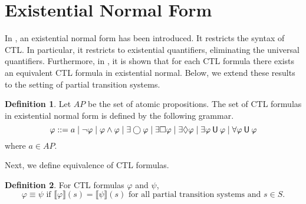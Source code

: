 \documentclass[12pt]{article}
\newcommand{\always}{\Box}
\newcommand{\eventually}{\Diamond}
\newcommand{\nxt}{\bigcirc}
\newcommand{\until}{\mathbin{\sf U}}
\theoremstyle{definition}
\newtheorem{definition}{Definition}
\newcommand{\satisfaction}[1]{\llbracket #1 \rrbracket}
\begin{document}
\section{Existential Normal Form}

In \cite[Definition~6.13]{BK08}, an existential normal form has been introduced.  It restricts the syntax of CTL.  In particular, it restricts to existential quantifiers, eliminating the universal quantifiers.  Furthermore, in \cite[Theorem~6.14]{BK08}, it is shown that for each CTL formula there exists an equivalent CTL formula in existential normal.  Below, we extend these results to the setting of partial transition systems.

\begin{definition}
Let $\mathit{AP}$ be the set of atomic propositions.  The set of CTL formulas in existential normal form is defined by the following grammar.
\[
\varphi
::= a
\mid \neg \varphi
\mid \varphi \wedge \varphi
\mid \exists \nxt \varphi
\mid \exists \always \varphi
\mid \exists \eventually \varphi
\mid \exists \varphi \until \varphi
\mid \forall \varphi \until \varphi
\]
where $a \in \mathit{AP}$.
\end{definition}

Next, we define equivalence of CTL formulas.

\begin{definition}
For CTL formulas $\varphi$ and $\psi$, 
\[
\varphi \equiv \psi \mbox{ if } \satisfaction{\varphi}(s) = \satisfaction{\psi}(s) \mbox{ for all partial transition systems and } s \in S.
\]
\end{definition}
\end{document}
